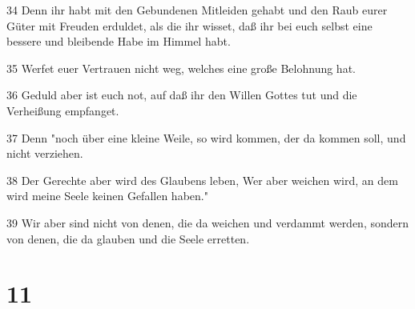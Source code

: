 \par 34 Denn ihr habt mit den Gebundenen Mitleiden gehabt und den Raub eurer Güter mit Freuden erduldet, als die ihr wisset, daß ihr bei euch selbst eine bessere und bleibende Habe im Himmel habt.
\par 35 Werfet euer Vertrauen nicht weg, welches eine große Belohnung hat.
\par 36 Geduld aber ist euch not, auf daß ihr den Willen Gottes tut und die Verheißung empfanget.
\par 37 Denn "noch über eine kleine Weile, so wird kommen, der da kommen soll, und nicht verziehen.
\par 38 Der Gerechte aber wird des Glaubens leben, Wer aber weichen wird, an dem wird meine Seele keinen Gefallen haben."
\par 39 Wir aber sind nicht von denen, die da weichen und verdammt werden, sondern von denen, die da glauben und die Seele erretten.

\chapter{11}

